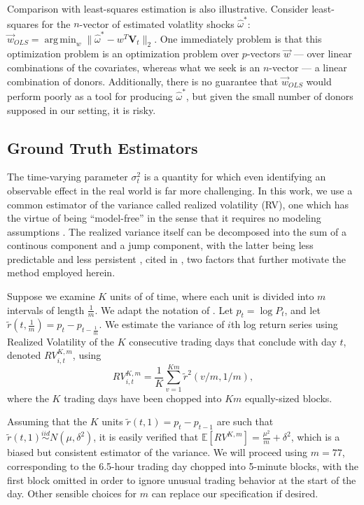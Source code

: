 \documentclass[11pt,3p,review,authoryear]{elsarticle}
\newcommand{\simiid}{\stackrel{iid}{\sim}} %
\DeclareMathOperator*{\argmin}{arg\,min} %
\def\E{\mathbb{E}} %
\theoremstyle{definition}
\begin{document}
\vspace*{12pt} Comparison with least-squares estimation is also illustrative.  Consider least-squares for the $n$-vector of estimated volatlity shocks $\hat\omega^{*}$: $\vec{w}_{OLS}=\argmin_{{w}} \|\hat{\omega}^{*} - w^{T}\textbf{V}_{t}\|_{2}$. One immediately  problem is that this optimization problem is an optimization problem over $p$-vectors $\vec{w}$ --- over linear combinations of the covariates, whereas what we seek is an $n$-vector --- a linear combination of donors.  Additionally, there is no guarantee that $\vec{w}_{OLS}$ would perform poorly as a tool for producing $\hat\omega^{*}$, but given the small number of donors supposed in our setting, it is risky.

\subsection{Ground Truth Estimators}
    \label{Ground Truth Estimators}
    
    The time-varying parameter $\sigma^{2}_{t}$ is a quantity for which even identifying an observable effect in the real world is far more challenging.  In this work, we use a common estimator of the variance called realized volatility (RV), one which has the virtue of being ``model-free'' in the sense that it requires no modeling assumptions \citep{andersen2010stochastic}.  The realized variance itself can be decomposed into the sum of a continous component and a jump component, with the latter being less predictable and less persistent \citep{andersen2007roughing}, cited in \citet{de2006forecasting}, two factors that further motivate the method employed herein.
    
    Suppose we examine $K$ units of of time, where each unit is divided into $m$ intervals of length $\frac{1}{m}$.  We adapt the notation of \citet{andersen2008realized}. Let $p_{t} = \log{P_{t}}$, and let $\tilde{r}(t,\frac{1}{m}) = p_{t} - p_{t-\frac{1}{m}}$.  We estimate the variance of $i$th log return series using Realized Volatility of the $K$ consecutive trading days that conclude with day $t$, denoted $RV_{i,t}^{K,m}$, using    
    $$
    RV_{i,t}^{K,m} = \frac{1}{K}\sum^{Km}_{v=1}\tilde{r}^{2}(v/m,1/m),
    $$
    where the $K$ trading days have been chopped into $Km$ equally-sized blocks.

    Assuming that the $K$ units $\tilde{r}(t, 1) = p_{t} - p_{t-1}$ are such that $\tilde{r}(t, 1) \simiid N(\mu, \delta^{2})$, it is easily verified that $\E[RV^{K,m}] = \frac{\mu^{2}}{m} + \delta^{2}$, which is a biased but consistent estimator of the variance.  We will proceed using $m = 77$, corresponding to the 6.5-hour trading day chopped into 5-minute blocks, with the first block omitted in order to ignore unusual trading behavior at the start of the day. Other sensible choices for $m$ can replace our specification if desired.
\end{document}
